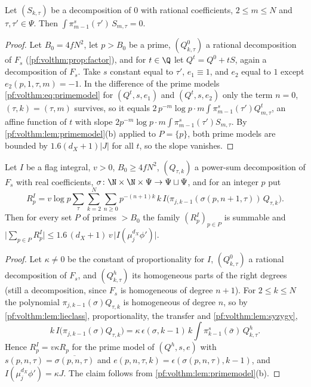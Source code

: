 \begin{lemma}\label{pf:volthm:lem:syzygy}
Let $(S_{k,\tau})$ be a decomposition of $0$ with rational coefficients, $2\le m\le N$ and $\tau,\tau'\in\Psi$. Then
$\int\pi^s_{m-1}(\tau')\,S_{m,\tau}=0$.
\end{lemma}

\begin{proof}
Let $B_0=4fN^2$, let $p>B_0$ be a prime, $(Q^0_{k,\tau})$ a rational decomposition of $F_s$
(\cref{pf:volthm:prop:factor}), and for $t\in\Q$ let $Q^t=Q^0+tS$, again a decomposition of $F_s$. Take $s$ constant equal to
$\tau'$, $e_1\equiv1$, and $e_2$ equal to $1$ except $e_2(p,1,\tau,m)=-1$. In the difference of the prime models
\eqref{pf:volthm:eq:primemodel} for $(Q^t,s,e_1)$ and $(Q^t,s,e_2)$ only the term $n=0$, $(\tau,k)=(\tau,m)$ survives, so
it equals $2\,p^{-m}\log p\cdot m\int\pi^s_{m-1}(\tau')Q^t_{m,\tau}$, an affine function of $t$ with slope
$2p^{-m}\log p\cdot m\int\pi^s_{m-1}(\tau')S_{m,\tau}$. By \cref{pf:volthm:lem:primemodel}(b) applied to $P=\{p\}$, both
prime models are bounded by $1.6(d_X+1)|J|$ for all $t$, so the slope vanishes.
\end{proof}

\begin{proposition}\label{pf:volthm:prop:restbound}
Let $I$ be a flag integral, $v>0$, $B_0\ge4fN^2$, $(Q_{\tau,k})$ a power-sum decomposition of $F_s$ with real
coefficients, $\sigma\colon\N\times\N\times\Psi\to\Psi\sqcup\Psi$, and for an integer $p$ put
\[
R^I_p=v\log p\sum_\tau\sum_{k=2}^N\sum_{n\ge0}p^{-(n+1)k}\,k\,I\bigl(\pi_{j,k-1}(\sigma(p,n+1,\tau))\,Q_{\tau,k}\bigr).
\]
Then for every set $P$ of primes $>B_0$ the family $(R^I_p)_{p\in P}$ is summable and
$\bigl|\sum_{p\in P}R^I_p\bigr|\le1.6\,(d_X+1)\,v\,\bigl|I(\mu_j^{d_X}\phi')\bigr|$.
\end{proposition}

\begin{proof}
Let $\kappa\ne0$ be the constant of proportionality for $I$, $(Q^0_{k,\tau})$ a rational decomposition of $F_s$, and
$(Q^h_{k,\tau})$ its homogeneous parts of the right degrees (still a decomposition, since $F_s$ is homogeneous of
degree $n+1$). For $2\le k\le N$ the polynomial $\pi_{j,k-1}(\sigma)Q_{\tau,k}$ is homogeneous of degree $n$, so by
\cref{pf:volthm:lem:lieclass}, proportionality, the transfer and \cref{pf:volthm:lem:syzygy},
\[
k\,I\bigl(\pi_{j,k-1}(\sigma)Q_{\tau,k}\bigr)=\kappa\,\epsilon(\sigma,k-1)\,k\int\pi^s_{k-1}(\bar\sigma)\,Q^h_{k,\tau}.
\]
Hence $R^I_p=v\kappa R_p$ for the prime model of $(Q^h,s,e)$ with $s(p,n,\tau)=\overline{\sigma(p,n,\tau)}$ and
$e(p,n,\tau,k)=\epsilon(\sigma(p,n,\tau),k-1)$, and $I(\mu_j^{d_X}\phi')=\kappa J$. The claim follows from
\cref{pf:volthm:lem:primemodel}(b).
\end{proof}

